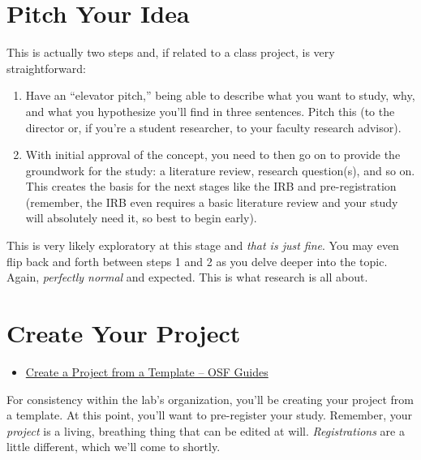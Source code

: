 \documentclass[]{tufte-book}
\providecommand{\tightlist}{%
  \setlength{\itemsep}{0pt}\setlength{\parskip}{0pt}}
\begin{document}
\hypertarget{pitch-your-idea}{%
\section{Pitch Your Idea}\label{pitch-your-idea}}

This is actually two steps and, if related to a class project, is very straightforward:

\begin{enumerate}
\def\labelenumi{\arabic{enumi}.}
\tightlist
\item
  Have an ``elevator pitch,'' being able to describe what you want to study, why, and what you hypothesize you'll find in three sentences. Pitch this (to the director or, if you're a student researcher, to your faculty research advisor).
\item
  With initial approval of the concept, you need to then go on to provide the groundwork for the study: a literature review, research question(s), and so on. This creates the basis for the next stages like the IRB and pre-registration (remember, the IRB even requires a basic literature review and your study will absolutely need it, so best to begin early).
\end{enumerate}

This is very likely exploratory at this stage and \emph{that is just fine}. You may even flip back and forth between steps 1 and 2 as you delve deeper into the topic. Again, \emph{perfectly normal} and expected. This is what research is all about.

\hypertarget{create-your-project}{%
\section{Create Your Project}\label{create-your-project}}

\begin{itemize}
\tightlist
\item
  \href{https://help.osf.io/hc/en-us/articles/360019930093-Create-a-Project-from-a-Template\#Use-a-public-project-as-a-template}{Create a Project from a Template -- OSF Guides}
\end{itemize}

For consistency within the lab's organization, you'll be creating your project from a template. At this point, you'll want to pre-register your study. Remember, your \emph{project} is a living, breathing thing that can be edited at will. \emph{Registrations} are a little different, which we'll come to shortly.
\end{document}

